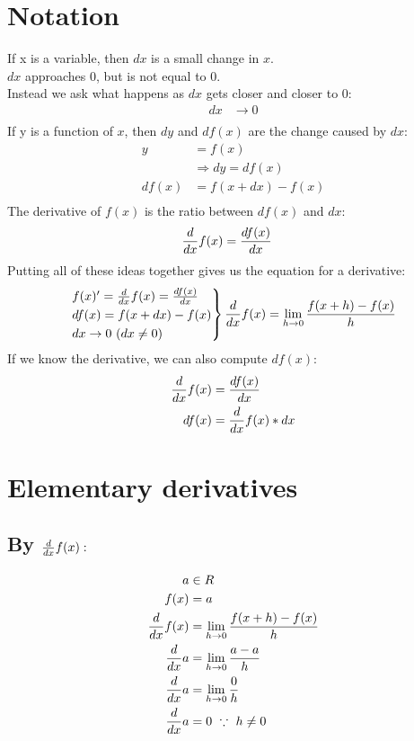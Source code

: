 \documentclass[a4paper,14pt,twoside]{book}
\begin{document}
{\section{Notation}
If x is a variable, then $dx$ is a small change in $x$. \\
$dx$ approaches $0$, but is not equal to $0$. \\
Instead we ask what happens as $dx$ gets closer and closer to $0:$ \\
\begin{align*}
	dx & \to 0 \\
\end{align*}
If y is a function of $x$, then $dy$ and $df(x)$ are the change caused by $dx:$
\begin{align*}
	y     & = f(x)                 \\
	      & \Rightarrow dy = df(x) \\
	df(x) & = f(x+dx) - f(x)       \\
\end{align*}
The derivative of $f(x)$ is the ratio between $df(x)$ and $dx:$
\begin{align*}
	\frac{d}{dx} f(x) & = \frac{df(x)}{dx}
\end{align*}
Putting all of these ideas together gives us the equation for a derivative$:$
\begin{align*}
	\begin{rcases*}
		f(x)' = \D f(x) = \DD{f(x)}{x} \\
		df(x) = f(x+dx) - f(x) \\
		dx \to 0\ (dx \ne 0)
	\end{rcases*}
	\D f(x) = \LIM{h}{0} \F{f(x+h)-f(x)}{h}
\end{align*}
If we know the derivative, we can also compute $df(x):$
\begin{align*}
	\frac{d}{dx} f(x) & = \frac{df(x)}{dx} \\
	df(x)   & = \frac{d}{dx} f(x) * dx
\end{align*}
\section{Elementary derivatives}
\subsection{By $\frac{d}{dx} f(x):$}
\begin{align*}
	a       & \in R                             \\
	f(x)    & = a                               \\
	\frac{d}{dx} f(x) & = \lim_{h \to 0} \frac{f(x+h) - f(x)}{h} \\
	\frac{d}{dx} a    & = \lim_{h \to 0} \frac{a-a}{h}           \\
	\frac{d}{dx} a    & = \lim_{h \to 0} \frac{0}{h}             \\
	\frac{d}{dx} a    & = 0\ \because\ h \ne 0
\end{align*}
}
\end{document}
